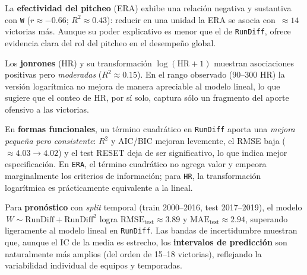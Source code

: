 \documentclass[man,floatsintext]{apa7}
\begin{document}
La \textbf{efectividad del pitcheo} (ERA) exhibe una relación negativa y sustantiva con \texttt{W} (\(r\approx -0.66\); \(R^2\approx 0.43\)): reducir en una unidad la ERA se asocia con \(\,\approx 14\) victorias más. Aunque su poder explicativo es menor que el de \texttt{RunDiff}, ofrece evidencia clara del rol del pitcheo en el desempeño global.

Los \textbf{jonrones} (HR) y su transformación \(\log(\text{HR}+1)\) muestran asociaciones positivas pero \textit{moderadas} (\(R^2\approx 0.15\)). En el rango observado (90–300 HR) la versión logarítmica no mejora de manera apreciable al modelo lineal, lo que sugiere que el conteo de HR, por sí solo, captura sólo un fragmento del aporte ofensivo a las victorias.

En \textbf{formas funcionales}, un término cuadrático en \texttt{RunDiff} aporta una \textit{mejora pequeña pero consistente}: \(R^2\) y AIC/BIC mejoran levemente, el RMSE baja (\(\approx 4.03 \rightarrow 4.02\)) y el test RESET deja de ser significativo, lo que indica mejor especificación. En \texttt{ERA}, el término cuadrático no agrega valor y empeora marginalmente los criterios de información; para \texttt{HR}, la transformación logarítmica es prácticamente equivalente a la lineal.

Para \textbf{pronóstico} con \textit{split} temporal (train 2000–2016, test 2017–2019), el modelo \(\,W \sim \text{RunDiff} + \text{RunDiff}^2\) logra \(\text{RMSE}_{\text{test}}\approx 3.89\) y \(\text{MAE}_{\text{test}}\approx 2.94\), superando ligeramente al modelo lineal en \texttt{RunDiff}. Las bandas de incertidumbre muestran que, aunque el IC de la media es estrecho, los \textbf{intervalos de predicción} son naturalmente más amplios (del orden de 15–18 victorias), reflejando la variabilidad individual de equipos y temporadas.
\end{document}
